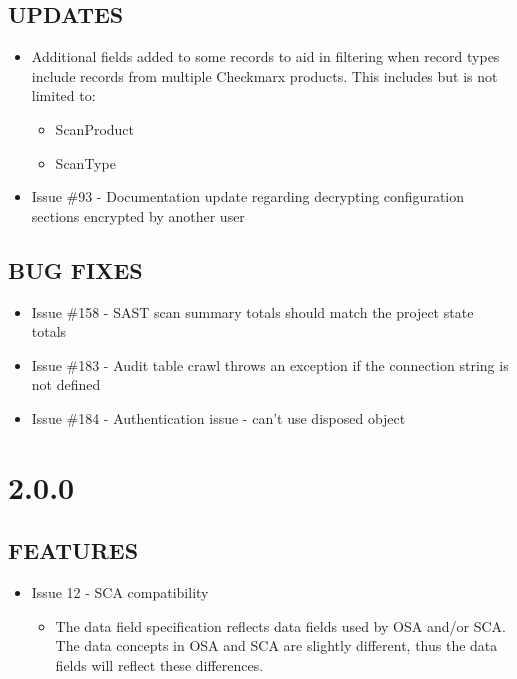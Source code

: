 \subsection*{UPDATES}
    \begin{itemize}
        \item Additional fields added to some records to aid in filtering when record types include records from multiple Checkmarx products.  
        This includes but is not limited to:
        \begin{itemize}
            \item ScanProduct
            \item ScanType
        \end{itemize}
        \item Issue \#93 - Documentation update regarding decrypting configuration sections encrypted by another user
    \end{itemize}

\subsection*{BUG FIXES}
    \begin{itemize}
        \item Issue \#158 - SAST scan summary totals should match the project state totals
        \item Issue \#183 - Audit table crawl throws an exception if the connection string is not defined
        \item Issue \#184 - Authentication issue - can't use disposed object
    \end{itemize}


\section{2.0.0}

\subsection*{FEATURES}
    \begin{itemize}
        \item Issue 12 - SCA compatibility
        \begin{itemize}
            \item The data field specification reflects data fields used by OSA and/or SCA.  The data concepts in OSA and SCA 
            are slightly different, thus the data fields will reflect these differences.
        \end{itemize}
    \end{itemize}

